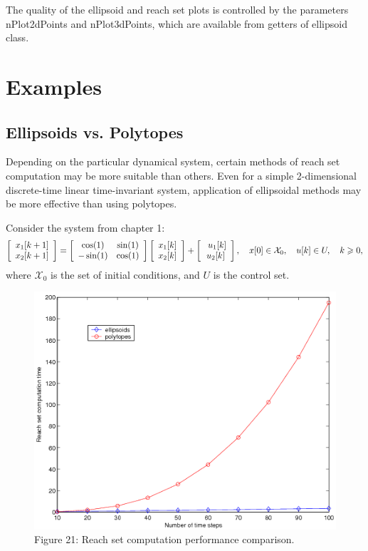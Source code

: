 \documentclass[letterpaper,10pt,english]{sphinxmanual}
\begin{document}
The quality of the ellipsoid and reach set plots is controlled by the
parameters nPlot2dPoints and nPlot3dPoints, which are available from
getters of ellipsoid class.


\chapter{Examples}
\label{chap_examples::doc}\label{chap_examples:examples}

\section{Ellipsoids vs. Polytopes}
\label{chap_examples:ellipsoids-vs-polytopes}
Depending on the particular dynamical system, certain methods of reach
set computation may be more suitable than others. Even for a simple
2-dimensional discrete-time linear time-invariant system, application of
ellipsoidal methods may be more effective than using polytopes.

Consider the system from chapter 1:
\begin{gather}
\begin{split}\left[\begin{array}{c}
x_1[k+1]\\
x_2[k+1]\end{array}\right] = \left[\begin{array}{cc}
\cos(1) & \sin(1)\\
-\sin(1) & \cos(1)\end{array}\right]\left[\begin{array}{c}
x_1[k]\\
x_2[k]\end{array}\right] + \left[\begin{array}{c}\
u_1[k]\\
u_2[k]\end{array}\right], ~~~ x[0]\in{\mathcal X}_0, ~~~ u[k]\in U, ~~~ k\geqslant0,\end{split}\notag
\end{gather}
where \({\mathcal X}_0\) is the set of initial conditions, and
\(U\) is the control set.
\begin{figure}[htbp]
\centering
\capstart

\includegraphics[width=0.500\linewidth]{chapter06_section01_ellpoly.png}
\caption{Figure 21: Reach set computation performance comparison.}\label{chap_examples:ellpolyfig}\end{figure}
\end{document}
